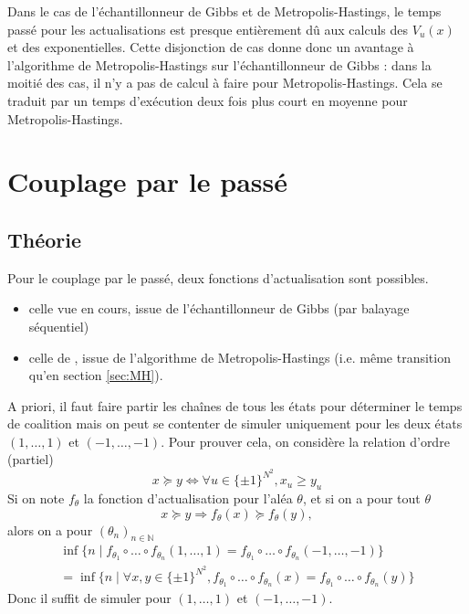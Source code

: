 \documentclass[a4paper,11pt]{article}
\begin{document}
Dans le cas de l'échantillonneur de Gibbs et de Metropolis-Hastings, le temps passé pour les actualisations est presque entièrement dû aux calculs des $V_u(x)$ et des exponentielles. Cette disjonction de cas donne donc un avantage à l'algorithme de Metropolis-Hastings sur l'échantillonneur de Gibbs : dans la moitié des cas, il n'y a pas de calcul à faire pour Metropolis-Hastings. Cela se traduit par un temps d'exécution deux fois plus court en moyenne pour Metropolis-Hastings.

\section{Couplage par le passé}\label{sec:coupling}

\subsection{Théorie}

Pour le couplage par le passé, deux fonctions d'actualisation sont possibles. 
\begin{itemize}
	\item celle vue en cours, issue de l'échantillonneur de Gibbs (par balayage séquentiel)
	\item celle de \cite{propp1998coupling}, issue de l'algorithme de Metropolis-Hastings (i.e. même transition qu'en section \ref{sec:MH}).
\end{itemize}

A priori, il faut faire partir les chaînes de tous les états pour déterminer le temps de coalition mais on peut se contenter de simuler uniquement pour les deux états $(1,\hdots,1)$ et $(-1,\hdots,-1)$. Pour prouver cela, on considère la relation d'ordre (partiel)
$$x \succcurlyeq y \Leftrightarrow \forall u \in \{ \pm 1 \} ^{N^2} , x_u \geq y_u$$
Si on note $f_{\theta}$ la fonction d'actualisation pour l'aléa $\theta$, et si on a pour tout $\theta$
$$x \succcurlyeq y \Rightarrow f_{\theta}(x) \succcurlyeq f_{\theta}(y),$$
alors on a pour $(\theta_n)_{n\in \mathbb{N}}$
\begin{align*}
\inf\{n \mid f_{\theta_1} \circ \hdots \circ f_{\theta_n}(1,\hdots,1)=f_{\theta_1} \circ \hdots \circ f_{\theta_n}(-1,\hdots,-1)\} \\
= \inf\{n \mid \forall x,y \in \{ \pm 1 \} ^{N^2}, f_{\theta_1} \circ \hdots \circ f_{\theta_n}(x)=f_{\theta_1} \circ \hdots \circ f_{\theta_n}(y)\}
\end{align*}
Donc il suffit de simuler pour $(1,\hdots,1)$ et $(-1,\hdots,-1)$.
\end{document}
